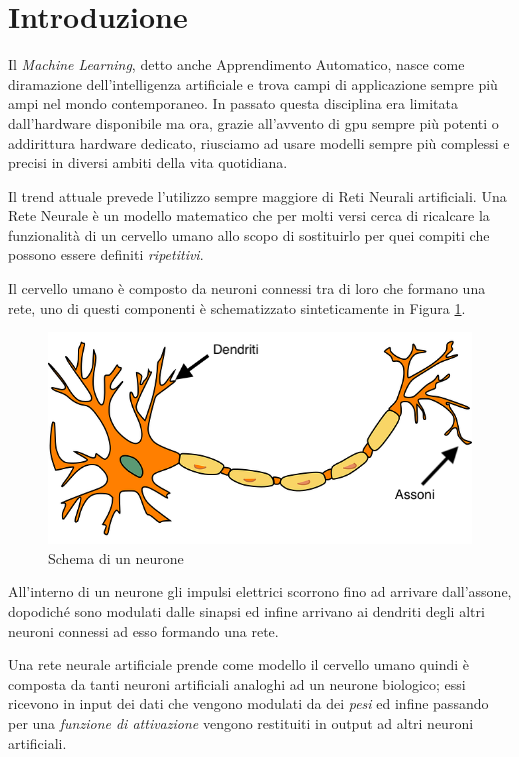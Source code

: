 \chapter*{Introduzione}
Il \textit{Machine Learning}, detto anche Apprendimento Automatico, nasce come diramazione dell'intelligenza artificiale e trova  campi di applicazione sempre più ampi nel mondo contemporaneo.  
In passato questa disciplina era limitata dall'hardware disponibile ma ora, grazie all'avvento di \ac{gpu} sempre più potenti o addirittura hardware dedicato, riusciamo ad usare modelli sempre più complessi e precisi in diversi ambiti della vita quotidiana. 

Il trend attuale prevede l'utilizzo sempre maggiore di Reti Neurali artificiali. Una Rete Neurale è un modello matematico che per molti versi cerca di ricalcare la funzionalità 
di un cervello umano allo scopo di sostituirlo per quei compiti che possono essere definiti \textit{ripetitivi}. 

Il cervello umano è composto da neuroni connessi tra di loro che formano una rete, uno di questi componenti è schematizzato sinteticamente in Figura \ref{fig:neurone}. 
\begin{figure}[]
    \centering
    \includegraphics[width = \textwidth]{images/neurone.png}
    \caption{Schema di un neurone}
    \label{fig:neurone}
\end{figure}
All'interno di un neurone gli impulsi elettrici scorrono fino ad arrivare dall'assone, dopodiché sono modulati dalle sinapsi ed infine arrivano ai dendriti degli altri neuroni connessi ad esso formando una rete.

Una rete neurale artificiale prende come modello il cervello umano quindi è composta da tanti neuroni artificiali analoghi ad un neurone biologico; essi ricevono in input dei dati che vengono 
modulati da dei \textit{pesi} ed infine passando per una \textit{funzione di attivazione} vengono restituiti in output ad altri neuroni artificiali. 

